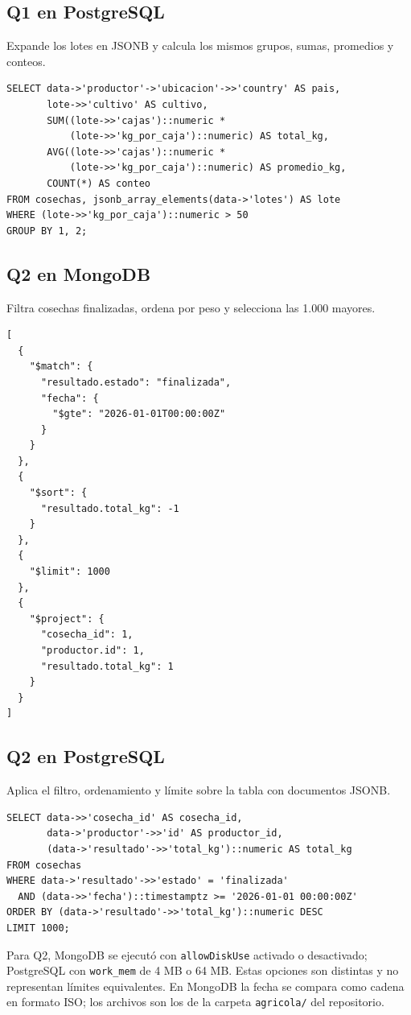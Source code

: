 \documentclass[12pt,letterpaper]{article}
\begin{document}
\subsection*{Q1 en PostgreSQL}
Expande los lotes en JSONB y calcula los mismos grupos, sumas, promedios y conteos.
{\small\begin{verbatim}
SELECT data->'productor'->'ubicacion'->>'country' AS pais,
       lote->>'cultivo' AS cultivo,
       SUM((lote->>'cajas')::numeric *
           (lote->>'kg_por_caja')::numeric) AS total_kg,
       AVG((lote->>'cajas')::numeric *
           (lote->>'kg_por_caja')::numeric) AS promedio_kg,
       COUNT(*) AS conteo
FROM cosechas, jsonb_array_elements(data->'lotes') AS lote
WHERE (lote->>'kg_por_caja')::numeric > 50
GROUP BY 1, 2;
\end{verbatim}}
\subsection*{Q2 en MongoDB}
Filtra cosechas finalizadas, ordena por peso y selecciona las 1.000 mayores.
{\small\begin{verbatim}
[
  {
    "$match": {
      "resultado.estado": "finalizada",
      "fecha": {
        "$gte": "2026-01-01T00:00:00Z"
      }
    }
  },
  {
    "$sort": {
      "resultado.total_kg": -1
    }
  },
  {
    "$limit": 1000
  },
  {
    "$project": {
      "cosecha_id": 1,
      "productor.id": 1,
      "resultado.total_kg": 1
    }
  }
]
\end{verbatim}}
\subsection*{Q2 en PostgreSQL}
Aplica el filtro, ordenamiento y límite sobre la tabla con documentos JSONB.
{\small\begin{verbatim}
SELECT data->>'cosecha_id' AS cosecha_id,
       data->'productor'->>'id' AS productor_id,
       (data->'resultado'->>'total_kg')::numeric AS total_kg
FROM cosechas
WHERE data->'resultado'->>'estado' = 'finalizada'
  AND (data->>'fecha')::timestamptz >= '2026-01-01 00:00:00Z'
ORDER BY (data->'resultado'->>'total_kg')::numeric DESC
LIMIT 1000;
\end{verbatim}}
Para Q2, MongoDB se ejecutó con \texttt{allowDiskUse} activado o desactivado; PostgreSQL con \texttt{work\_mem} de 4 MB o 64 MB. Estas opciones son distintas y no representan límites equivalentes. En MongoDB la fecha se compara como cadena en formato ISO; los archivos son los de la carpeta \texttt{agricola/} del repositorio.
\end{document}
